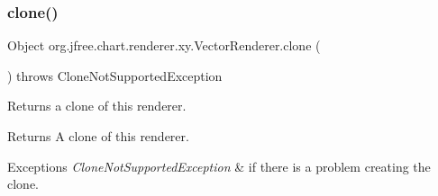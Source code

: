 \subsubsection{\texorpdfstring{clone()}{clone()}}
{\footnotesize\ttfamily Object org.\+jfree.\+chart.\+renderer.\+xy.\+Vector\+Renderer.\+clone (\begin{DoxyParamCaption}{ }\end{DoxyParamCaption}) throws Clone\+Not\+Supported\+Exception}

Returns a clone of this renderer.

\begin{DoxyReturn}{Returns}
A clone of this renderer.
\end{DoxyReturn}

\begin{DoxyExceptions}{Exceptions}
{\em Clone\+Not\+Supported\+Exception} & if there is a problem creating the clone. \\
\hline
\end{DoxyExceptions}
\mbox{\label{classorg_1_1jfree_1_1chart_1_1renderer_1_1xy_1_1_vector_renderer_a24c7f526c9595d5c75b8cde59c64620a}} 
